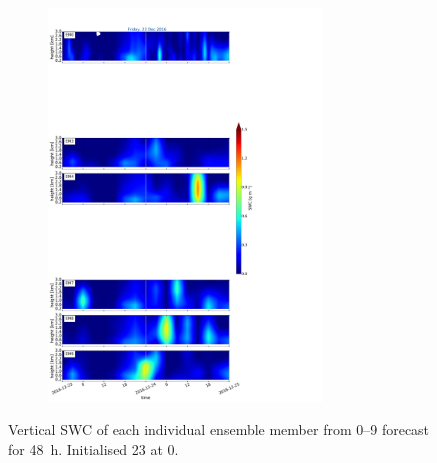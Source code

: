 \begin{figure}[h]%
	\centering
	\begin{subfigure}[t]{\textwidth} 
		\centering
		\includegraphics[trim={0cm 0cm 18.3cm 5.1cm},clip,width=0.8\textwidth]{./fig_09EM/20161223}
		\caption{}\label{fig:EM09_23}
	\end{subfigure}
	\caption{Vertical SWC of each individual ensemble member from \numrange{0}{9} forecast for \SI{48}{\hour}. Initialised \SI{23}{\dec} at \SI{0}{\UTC}.}\label{fig:EM09}
\end{figure}
